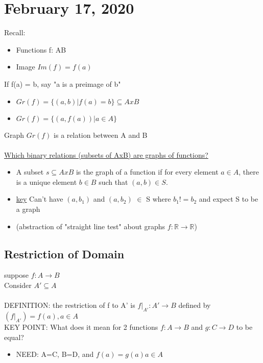 \documentclass{article}
\begin{document}
\tableofcontents

\section{February 17, 2020}
   
Recall:
\begin{itemize}
  \item Functions f: A\textrightarrow  B
  \item Image $Im(f) = f(a)$
\end{itemize}

\noindent If f(a) = b, say "a is a preimage of b"
\begin{itemize}
  \item $Gr(f) = \{(a,b) | f(a)=b\}\subseteq AxB$
  \item $Gr(f) = \{(a,f(a)) | a \in A\}$
\end{itemize}

\noindent Graph $Gr(f)$ is a relation between A and B\\
\\
\underline{Which binary relations (subsets of AxB) are graphs of functions?}
\begin{itemize}
  \item A subset $s\subseteq AxB$ is the graph of a function if for every element $a \in A$, there is a unique element $b \in B$ such that $(a,b) \in S$.
  \item \underline{key} Can't have $(a, b_1)$ and $(a, b_2)$ $\in$ S where $b_1 != b_2$ and expect S to be a graph
  \item (abstraction of "straight line test" about graphs $f:\mathbb{R}\rightarrow\mathbb{R}$)
\end{itemize}

\subsection{Restriction of Domain}

\indent suppose $f:A \rightarrow B$\\
\indent Consider $A'\subseteq A$\\ \\
\indent DEFINITION: the restriction of f to A' is $f|_{A'}: A' \rightarrow B$ defined by $(f|_{A'})=f(a), a \in A$\\

\indent KEY POINT: What does it mean for 2 functions $f:A \rightarrow B$ and $g:C \rightarrow D$ to be equal?
\begin{itemize}
\item NEED: A=C, B=D, and $f(a)=g(a) a \in A $\\
\end{itemize}
\end{document}
